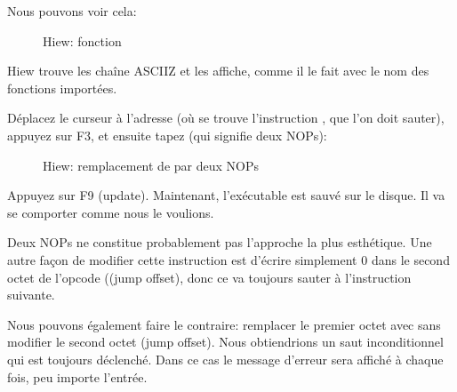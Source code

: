 Nous pouvons voir cela:

\begin{figure}[H]
\centering
{}
\caption{Hiew: fonction \main}
\label{fig:scanf_ex3_hiew_1}
\end{figure}

Hiew trouve les chaîne \ac{ASCIIZ} et les affiche, comme il le fait avec le nom
des fonctions importées.

\clearpage
Déplacez le curseur à l'adresse  (où se trouve l'instruction ,
que l'on doit sauter), appuyez sur F3, et ensuite tapez  (qui signifie deux
\ac{NOP}s):

\begin{figure}[H]
\centering
{}
\caption{Hiew: remplacement de  par deux \ac{NOP}s}
\label{fig:scanf_ex3_hiew_2}
\end{figure}

Appuyez sur F9 (update). Maintenant, l'exécutable est sauvé sur le disque. Il va
se comporter comme nous le voulions.

Deux \ac{NOP}s ne constitue probablement pas l'approche la plus esthétique.
Une autre façon de modifier cette instruction est d'écrire simplement 0 dans le
second octet de l'opcode ((\gls{jump offset}), donc ce  va toujours sauter
à l'instruction suivante.

Nous pouvons également faire le contraire: remplacer le premier octet avec 
sans modifier le second octet (\gls{jump offset}).
Nous obtiendrions un saut inconditionnel qui est toujours déclenché.
Dans ce cas le message d'erreur sera affiché à chaque fois, peu importe l'entrée.

